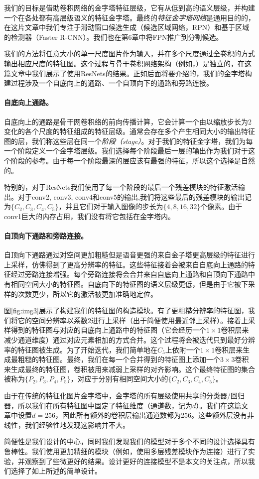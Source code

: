 \documentclass[../main.tex]{subfile}
\begin{document}
我们的目标是借助卷积网络的金字塔特征层级，它有从低到高的语义层级，并构建一个在各处都有高层级语义的特征金字塔。最终的\textit{特征金字塔网络}是通用目的的，在这片文章中我们专注于滑动窗口候选生成（候选区域网络，RPN）和基于区域的检测器（Faster R-CNN）。我们也在第6章中将FPN推广到分割候选。

我们的方法将任意大小的单一尺度图片作为输入，并在多个尺度通过全卷积的方式输出相应尺度的特征图。这个过程与骨干卷积网络架构（例如，\cite{19,36,16}）是独立的，在这篇文章中我们展示了使用ResNets\cite{resnet}的结果。正如后面将要介绍的，我们的金字塔构建过程涉及一个自底向上的通路、一个自顶向下的通路和旁路连接。

\paragraph{自底向上通路。}自底向上的通路是骨干网卷积络的前向传播计算，它会计算一个由以缩放步长为2变化的各个尺度的特征组成的特征层级。通常会存在多个产生相同大小的输出特征图的层，我们称这些层在同一个\textit{阶段（stage）}。对于我们的特征金字塔，我们为每一个阶段定义一个金字塔层级。我们选择每个阶段最后一层的输出作为我们对于这个阶段的参考。由于每一个阶段最深的层应该有最强的特征，所以这个选择是自然的。

特别的，对于ResNets\cite{resnet}我们使用了每一个阶段的最后一个残差模块的特征激活输出。对于conv2, conv3, conv4和conv5的输出,我们将这些最后的残差模块的输出记为$\{C_2, C_3,C_4,C_5\}$，并且它们对于输入图像的步长为$\{4, 8, 16, 32\}$个像素。由于conv1巨大的内存占用，我们没有将它包括在金字塔内。

\paragraph{自顶向下通路和旁路连接。}自顶向下通路通过对空间更加粗糙但是语音更强的来自金子塔更高层级的特征进行上采样，仿佛得到了更高分辨率的特征。这些特征接着会被来自自底向上通路的特征经过旁路连接增强。每个旁路连接将会合并来自自底向上通路和自顶向下通路中有相同空间大小的特征图。自底向下的特征图的语义层级更低，但是由于它被下采样的次数更少，所以它的激活被更加准确地定位。

图\ref{fig:img3}展示了构建我们的特征图的构造模块。有了更粗糙分辨率的特征图，我们将它的空间分辨率以系数2进行上采样（出于简便使用最近邻上采样）。接着上采样得到的特征图与对应的自底向上通路中的特征图（它会经历一个$1\times 1$卷积层来减少通道维度）通过对应元素相加的方式合并。这个过程将会被迭代只到最好分辨率的特征图被生成。为了开始迭代，我们简单地在$C_5$上依附一个$1\times 1$卷积层来生成最粗糙的特征图。最终，我们在每一个合并得到的特征图上添加一个$3\times 3$卷积来生成最终的特征图，卷积被用来减弱上采样的对齐影响。这个最终特征图的集合被称为$\{P_2,P_3,P_4,P_5\}$，对应于分别有相同空间大小的$\{C_2,C_3,C_4, C_5\}$。

由于在传统的特征化图片金字塔中，金字塔的所有层级使用共享的分类器/回归器，所以我们在所有特征图中固定了特征维度（通道数，记为$d$）。我们在这篇文章中设置$d=256$，因此所有额外的卷积层输出通道数都为256。这些额外层没有非线性，我们经验性地发现这影响并不大。

简便性是我们设计的中心，同时我们发现我们的模型对于多个不同的设计选择具有鲁棒性。我们使用更加精细的模块（例如，使用多层残差模块\cite{resnet}作为连接）进行了实验，并观察到了些微更好的结果。设计更好的连接模型不是本文的关注点，所以我们选择了如上所述的简单设计。
\end{document}
